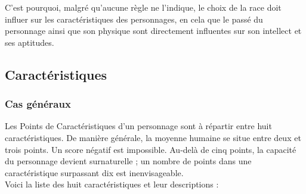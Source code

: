 C’est pourquoi, malgré qu’aucune règle ne l’indique, le choix de la race doit influer sur les caractéristiques des personnages, 
en cela que le passé du personnage ainsi que son physique sont directement influentes sur son intellect et ses aptitudes.

\subsection{Caractéristiques}
\subsubsection{Cas généraux}

Les Points de Caractéristiques d’un personnage sont à répartir entre huit caractéristiques. 
De manière générale, la moyenne humaine se situe entre deux et trois points. Un score négatif est impossible. 
Au-delà de cinq points, la capacité du personnage devient surnaturelle ; un nombre de points dans une caractéristique surpassant dix est inenvisageable.\\
Voici la liste des huit caractéristiques et leur descriptions :
